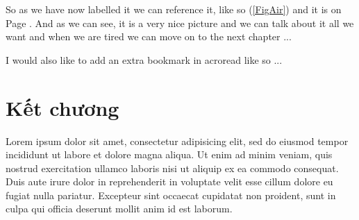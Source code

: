 
So as we have now labelled it we can reference it, like so (\ref{FigAir}) and it
is on Page \pageref{FigAir}. And as we can see, it is a very nice picture and we
can talk about it all we want and when we are tired we can move on to the next
chapter ...

I would also like to add an extra bookmark in acroread like so ...
\ifpdf
\fi


\section{Kết chương}
Lorem ipsum dolor sit amet, consectetur adipisicing elit, sed do eiusmod tempor incididunt ut labore et dolore magna aliqua. Ut enim ad minim veniam, quis nostrud exercitation ullamco laboris nisi ut aliquip ex ea commodo consequat. Duis aute irure dolor in reprehenderit in voluptate velit esse cillum dolore eu fugiat nulla pariatur. Excepteur sint occaecat cupidatat non proident, sunt in culpa qui officia deserunt mollit anim id est laborum.

